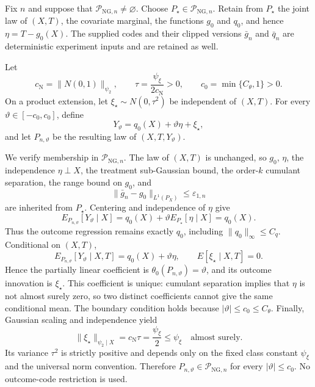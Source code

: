 Fix \(n\) and suppose that \(\mathcal P_{\mathrm{NG},n}\neq\varnothing\).  Choose \(P_{\star}\in\mathcal P_{\mathrm{NG},n}\).  Retain from \(P_{\star}\) the joint law of \((X,T)\), the covariate marginal, the functions \(g_0\) and \(q_0\), and hence \(\eta=T-g_0(X)\).  The supplied codes and their clipped versions \(\bar g_n\) and \(\bar q_n\) are deterministic experiment inputs and are retained as well.

Let
\[
 c_{\mathrm N}=\lVert N(0,1)\rVert_{\psi_2},
 \qquad
 \tau=\frac{\psi_{\xi}}{2c_{\mathrm N}}>0,
 \qquad
 c_0=\min\{C_{\theta},1\}>0.
\]
On a product extension, let \(\xi_{\star}\sim N(0,\tau^2)\) be independent of \((X,T)\).  For every \(\vartheta\in[-c_0,c_0]\), define
\[
 Y_{\vartheta}=q_0(X)+\vartheta\eta+\xi_{\star},
\]
and let \(P_{n,\vartheta}\) be the resulting law of \((X,T,Y_{\vartheta})\).

We verify membership in \(\mathcal P_{\mathrm{NG},n}\).  The law of \((X,T)\) is unchanged, so \(g_0\), \(\eta\), the independence \(\eta\perp X\), the treatment sub-Gaussian bound, the order-\(k\) cumulant separation, the range bound on \(g_0\), and
\[
 \lVert\bar g_n-g_0\rVert_{L^1(P_X)}\le\varepsilon_{1,n}
\]
are inherited from \(P_{\star}\).  Centering and independence of \(\eta\) give
\[
 E_{P_{n,\vartheta}}[Y_{\vartheta}\mid X]
 =q_0(X)+\vartheta E_{P_{\star}}[\eta\mid X]
 =q_0(X).
\]
Thus the outcome regression remains exactly \(q_0\), including \(\lVert q_0\rVert_{\infty}\le C_q\).  Conditional on \((X,T)\),
\[
 E_{P_{n,\vartheta}}[Y_{\vartheta}\mid X,T]
 =q_0(X)+\vartheta\eta,
 \qquad
 E[\xi_{\star}\mid X,T]=0.
\]
Hence the partially linear coefficient is \(\theta_0(P_{n,\vartheta})=\vartheta\), and its outcome innovation is \(\xi_{\star}\).  This coefficient is unique: cumulant separation implies that \(\eta\) is not almost surely zero, so two distinct coefficients cannot give the same conditional mean.  The boundary condition holds because \(|\vartheta|\le c_0\le C_{\theta}\).  Finally, Gaussian scaling and independence yield
\[
 \lVert\xi_{\star}\rVert_{\psi_2\mid X}
 =c_{\mathrm N}\tau
 =\frac{\psi_{\xi}}2
 \le\psi_{\xi}
 \quad\text{almost surely}.
\]
Its variance \(\tau^2\) is strictly positive and depends only on the fixed class constant \(\psi_{\xi}\) and the universal norm convention.  Therefore \(P_{n,\vartheta}\in\mathcal P_{\mathrm{NG},n}\) for every \(|\vartheta|\le c_0\).  No outcome-code restriction is used.

